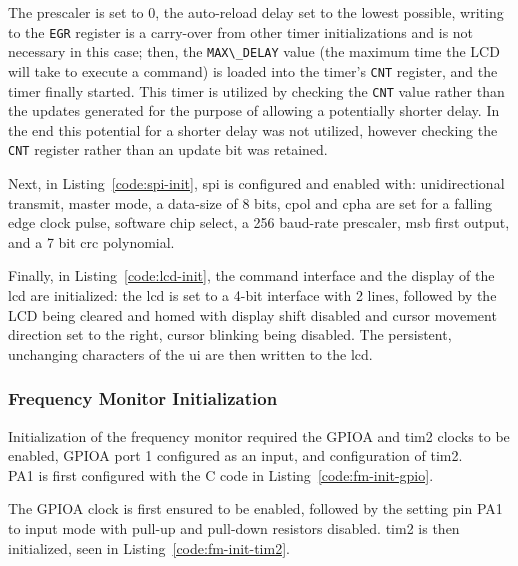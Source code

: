The prescaler is set to 0, the auto-reload delay set to the lowest
possible, writing to the \lstinline{EGR} register is a carry-over from
other timer initializations and is not necessary in this case; then, the
\lstinline{MAX\_DELAY} value (the maximum time the LCD will take to
execute a command) is loaded into the timer's \lstinline{CNT}
register, and the timer finally started. This timer is utilized
by checking the \lstinline{CNT} value rather than the updates generated
for the purpose of allowing a potentially shorter delay. In the end this
potential for a shorter delay was not utilized, however checking the
\lstinline{CNT} register rather than an update bit was retained.

Next, in Listing~\ref{code:spi-init}, \gls{spi} is configured and
enabled with: unidirectional transmit, master mode, a data-size of 8
bits, \gls{cpol} and \gls{cpha} are set for a falling edge clock pulse, software chip select, a 256 baud-rate
prescaler, \gls{msb} first output, and a 7 bit \gls{crc} polynomial.


Finally, in Listing~\ref{code:lcd-init}, the command interface and
the display of the \gls{lcd} are initialized: the \gls{lcd} is set to a
4-bit interface with 2 lines, followed by the LCD being cleared and
homed with display shift disabled and cursor movement direction set to
the right, cursor blinking being disabled. The persistent, unchanging
characters of the \gls{ui} are then written to the \gls{lcd}.


\subsubsection{Frequency Monitor Initialization}

Initialization of the frequency monitor required the GPIOA and
\gls{tim2} clocks to be enabled, GPIOA port 1 configured as an input,
and configuration of \gls{tim2}. \\

PA1 is first configured with the C code in Listing~\ref{code:fm-init-gpio}.


The GPIOA clock is first ensured to be enabled, followed by the setting
pin PA1 to input mode with pull-up and pull-down resistors disabled.
\gls{tim2} is then initialized, seen in Listing~\ref{code:fm-init-tim2}.


